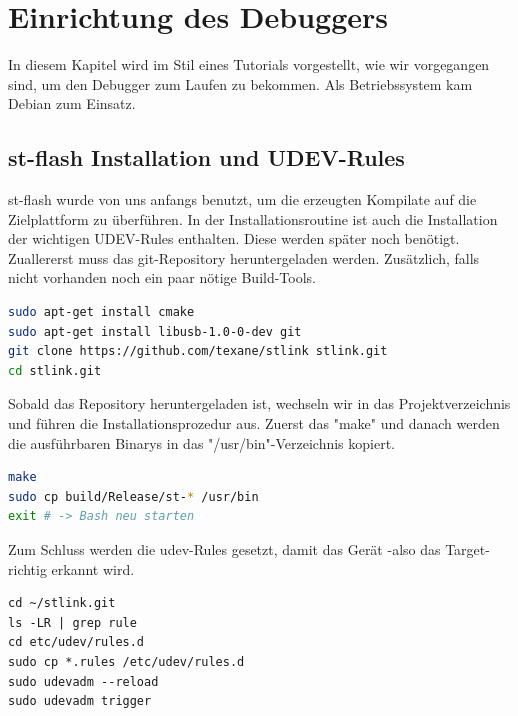 \chapter{Einrichtung des Debuggers}
In diesem Kapitel wird im Stil eines Tutorials vorgestellt, wie wir vorgegangen sind, um den Debugger zum Laufen zu bekommen. Als Betriebssystem kam Debian zum Einsatz.
\section{st-flash Installation und UDEV-Rules}
st-flash wurde von uns anfangs benutzt, um die erzeugten Kompilate auf die Zielplattform zu überführen. In der Installationsroutine ist auch die Installation der wichtigen UDEV-Rules enthalten. Diese werden später noch benötigt.
Zuallererst muss das git-Repository heruntergeladen werden. Zusätzlich, falls nicht vorhanden noch ein paar nötige Build-Tools.
\begin{lstlisting}[language=sh]
sudo apt-get install cmake
sudo apt-get install libusb-1.0-0-dev git
git clone https://github.com/texane/stlink stlink.git
cd stlink.git
\end{lstlisting}
Sobald das Repository heruntergeladen ist, wechseln wir in das Projektverzeichnis und führen die Installationsprozedur aus. Zuerst das "make" und danach werden die ausführbaren Binarys in das "/usr/bin"-Verzeichnis kopiert.
\begin{lstlisting}[language=sh]
make
sudo cp build/Release/st-* /usr/bin
exit # -> Bash neu starten
\end{lstlisting}
Zum Schluss werden die udev-Rules gesetzt, damit das Gerät -also das Target- richtig erkannt wird.
\begin{lstlisting}
cd ~/stlink.git
ls -LR | grep rule
cd etc/udev/rules.d
sudo cp *.rules /etc/udev/rules.d
sudo udevadm --reload
sudo udevadm trigger
\end{lstlisting}
